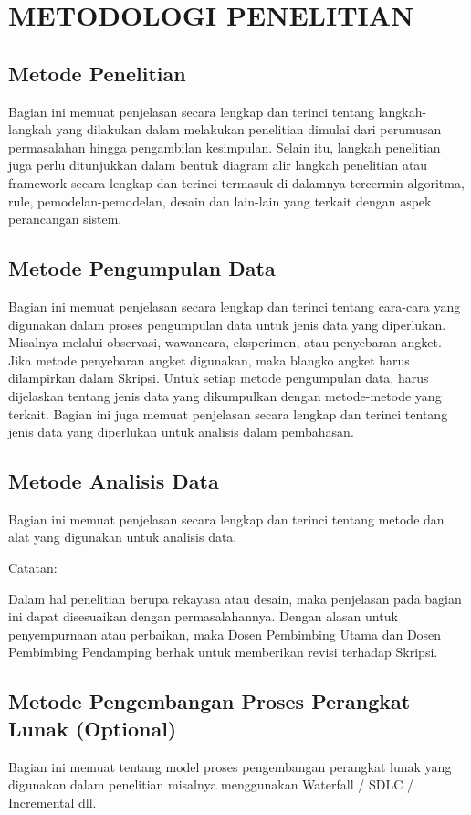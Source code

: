 \documentclass[oneside,listof=totoc]{scrbook}
\begin{document}
\chapter{METODOLOGI PENELITIAN}

\vspace{0.5cm}

\section{Metode Penelitian}
Bagian ini memuat penjelasan secara lengkap dan terinci tentang langkah-langkah yang dilakukan dalam melakukan penelitian dimulai dari perumusan permasalahan hingga pengambilan kesimpulan. Selain itu, langkah penelitian juga perlu ditunjukkan dalam bentuk diagram alir langkah penelitian atau framework secara lengkap dan terinci termasuk di dalamnya tercermin algoritma, rule, pemodelan-pemodelan, desain dan lain-lain yang terkait dengan aspek perancangan sistem.

\section{Metode Pengumpulan Data}
Bagian ini memuat penjelasan secara lengkap dan terinci tentang cara-cara yang digunakan dalam proses pengumpulan data untuk jenis data yang diperlukan. Misalnya melalui observasi, wawancara, eksperimen, atau penyebaran angket. Jika metode penyebaran angket digunakan, maka blangko angket harus dilampirkan dalam Skripsi. Untuk setiap metode pengumpulan data, harus dijelaskan tentang jenis data yang dikumpulkan dengan metode-metode yang terkait. Bagian ini juga memuat penjelasan secara lengkap dan terinci tentang jenis data yang diperlukan untuk analisis dalam pembahasan.

\section{Metode Analisis Data}
Bagian ini memuat penjelasan secara lengkap dan terinci tentang metode dan alat yang digunakan untuk analisis data.

\noindent Catatan:

Dalam hal penelitian berupa rekayasa atau desain, maka penjelasan pada bagian ini dapat disesuaikan dengan permasalahannya. Dengan alasan untuk penyempurnaan atau perbaikan, maka Dosen Pembimbing Utama dan Dosen Pembimbing Pendamping berhak untuk memberikan revisi terhadap Skripsi.

\section{Metode Pengembangan Proses Perangkat Lunak (Optional)}
Bagian ini memuat tentang model proses pengembangan perangkat lunak yang digunakan dalam penelitian misalnya menggunakan Waterfall / SDLC / Incremental dll.
\end{document}
